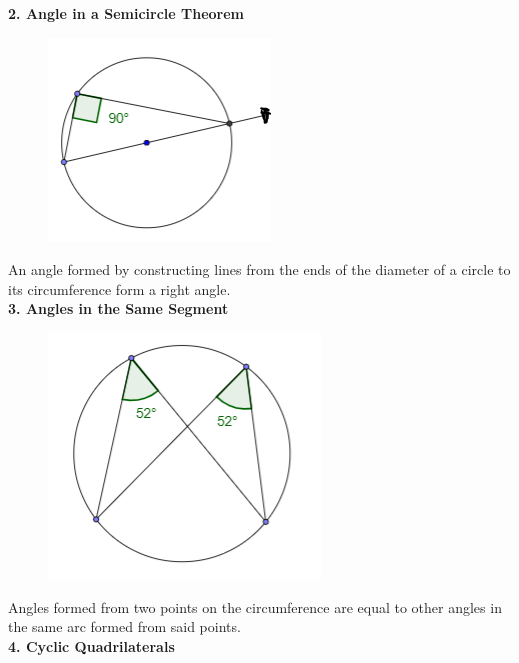 \documentclass{article}
\begin{document}
            \pagebreak
            \noindent \color{purple} \textbf{2. Angle in a Semicircle Theorem} \color{black} \\
            \begin{figure} [hbt!]
                \centering
                \includegraphics[scale=0.75]{Resources/Unit4Circles/circle2.PNG}
            \end{figure}

            \noindent An angle formed by constructing lines from the ends of the diameter of a circle
            to its circumference form a right angle. \\

            \noindent \color{purple} \textbf{3. Angles in the Same Segment} \color{black} \\

            \begin{figure} [hbt!]
                \centering
                \includegraphics[scale=0.7]{Resources/Unit4Circles/circle3.PNG}
            \end{figure}

            \noindent Angles formed from two points on the circumference are equal to other angles
            in the same arc formed from said points. \\

            \noindent \color{purple} \textbf{4. Cyclic Quadrilaterals} \color{black} \\
\end{document}
